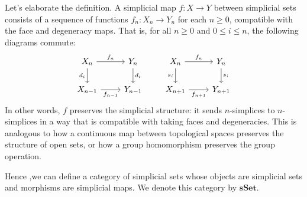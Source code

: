 \documentclass[11pt]{article}
\theoremstyle{definition}
\theoremstyle{plain}
\begin{document}
Let's elaborate the definition. A simplicial map $f : X \to Y$ between simplicial sets consists of a sequence of functions $f_n : X_n \to Y_n$ for each $n \geq 0$, compatible with the face and degeneracy maps. That is, for all $n \geq 0$ and $0 \leq i \leq n$, the following diagrams commute:
\[
    \begin{tikzcd}
        X_n \arrow[r,"f_n"] \arrow[d,"d_i"'] & Y_n \arrow[d,"d_i"] \\
        X_{n-1} \arrow[r,"f_{n-1}"'] & Y_{n-1}
    \end{tikzcd}
    \qquad
    \begin{tikzcd}
        X_n \arrow[r,"f_n"] \arrow[d,"s_i"'] & Y_n \arrow[d,"s_i"] \\
        X_{n+1} \arrow[r,"f_{n+1}"'] & Y_{n+1}
    \end{tikzcd}
\]
In other words, $f$ preserves the simplicial structure: it sends $n$-simplices to $n$-simplices in a way that is compatible with taking faces and degeneracies. This is analogous to how a continuous map between topological spaces preserves the structure of open sets, or how a group homomorphism preserves the group operation.


Hence ,we can define a category of simplicial sets whose objects are simplicial sets and morphisms are simplicial maps. We denote this category by $\mathbf{sSet}$.
\end{document}
